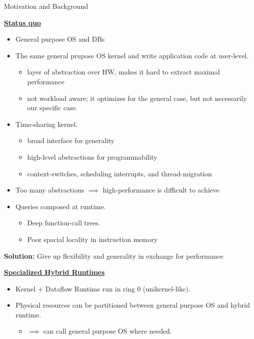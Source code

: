 \begin{block}{Motivation and Background}

\underline{\textbf{Status quo}}
  \begin{itemize}
  \item General purpose OS and DBs%
  \item The same general prupose OS kernel and write application code at user-level.
    \begin{itemize}
    \item layer of abstraction over HW, makes it hard to extract maximal performance
    \item not workload aware; it optimizes for the general case, but not necessarily our specific case.
    \end{itemize}
 
  \item Time-sharing kernel.
    \begin{itemize}
    \item broad interface for generality
    \item high-level abstractions for programmability
    \item context-switches, scheduling interrupts, and thread-migration
    \end{itemize}
    \item Too many abstractions $\implies$ high-performance is difficult to achieve
  
  \item Queries composed at runtime.
    \begin{itemize}
    \item Deep function-call trees.
    \item Poor spacial locality in instruction memory
    \end{itemize}
  \end{itemize}

  \begin{center}
    \alert{\textbf{Solution:} Give up flexibility and generality in exchange for performance}
  \end{center}
   
  \underline{\textbf{Specialized Hybrid Runtimes}}
    \begin{itemize}
    \item Kernel + Dataflow Runtime run in ring 0 (unikernel-like).
    \item Physical resources can be partitioned between general purpose OS and hybrid runtime\cite{KOCOLOSKI:2015:PISCES}.
      \begin{itemize}
      \item $\implies$ can call general purpose OS where needed.
      \end{itemize}


\end{itemize}
\end{block}

